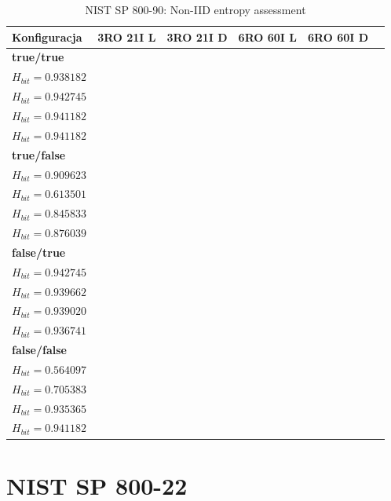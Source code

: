 \begin{table}[H]
\centering
\caption{NIST SP 800-90: Non-IID entropy assessment}
\label{tab:ch4_NIST_SP_800_90}
\begin{tabular}{|l|c|c|c|c|c|}
\hline
\textbf{Konfiguracja} & \textbf{3RO 21I L} & \textbf{3RO 21I D} & \textbf{6RO 60I L} & \textbf{6RO 60I D} \\ \hline

\textbf{true/true} &  
\makecell{$H_{orig}=7.920709$ \\ $H_{bit}=0.938182$} & 
\makecell{$H_{orig}=7.464863$ \\ $H_{bit}=0.942745$} & 
\makecell{$H_{orig}=7.915044$ \\ $H_{bit}=0.941182$} & 
\makecell{$H_{orig}=7.927649$ \\ $H_{bit}=0.941182$} \\ \hline

\textbf{true/false} &
\makecell{$H_{orig}=7.472761$ \\ $H_{bit}=0.909623$} &
\makecell{$H_{orig}=6.207777$ \\ $H_{bit}=0.613501$} &
\makecell{$H_{orig}=7.809146$ \\ $H_{bit}=0.845833$} & 
\makecell{$H_{orig}=7.879265$ \\ $H_{bit}=0.876039$} \\ \hline

\textbf{false/true} &
\makecell{$H_{orig}=7.909022$ \\ $H_{bit}=0.942745$} &
\makecell{$H_{orig}=7.916658$ \\ $H_{bit}=0.939662$} &
\makecell{$H_{orig}=7.926010$ \\ $H_{bit}=0.939020$} & 
\makecell{$H_{orig}=7.464863$ \\ $H_{bit}=0.936741$} \\ \hline

\textbf{false/false} &
\makecell{$H_{orig}=6.571477$ \\ $H_{bit}=0.564097$} &
\makecell{$H_{orig}=6.410998$ \\ $H_{bit}=0.705383$} &
\makecell{$H_{orig}=7.858099$ \\ $H_{bit}=0.935365$} & 
\makecell{$H_{orig}=7.836317$ \\ $H_{bit}=0.941182$} \\ \hline
\end{tabular}
\end{table}

\section{NIST SP 800-22}

